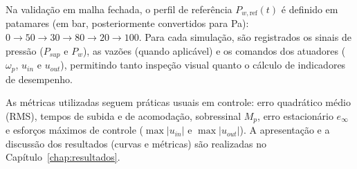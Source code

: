 Na validação em malha fechada, o perfil de referência $P_{w,\text{ref}}(t)$ é definido em patamares (em bar, posteriormente convertidos para Pa): $0\rightarrow 50\rightarrow 30\rightarrow 80\rightarrow 20\rightarrow 100$. Para cada simulação, são registrados os sinais de pressão ($P_{sup}$ e $P_w$), as vazões (quando aplicável) e os comandos dos atuadores (\,$\omega_p$, $u_{in}$ e $u_{out}$), permitindo tanto inspeção visual quanto o cálculo de indicadores de desempenho.

As métricas utilizadas seguem práticas usuais em controle: erro quadrático médio (RMS), tempos de subida e de acomodação, sobressinal $M_p$, erro estacionário $e_\infty$ e esforços máximos de controle ($\max |u_{in}|$ e $\max |u_{out}|$). A apresentação e a discussão dos resultados (curvas e métricas) são realizadas no Capítulo~\ref{chap:resultados}.